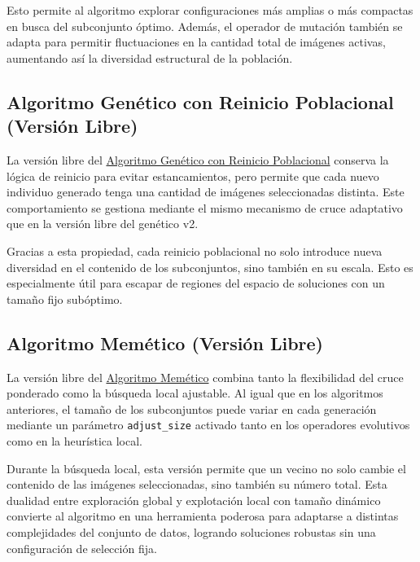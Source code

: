Esto permite al algoritmo explorar configuraciones más amplias o más compactas en busca del subconjunto óptimo.
Además, el operador de mutación también se adapta para permitir fluctuaciones en la cantidad total de imágenes activas,
aumentando así la diversidad estructural de la población.

\subsection{Algoritmo Genético con Reinicio Poblacional (Versión Libre)}\label{subsec:genetico-v3-libre}

La versión libre del \hyperref[sec:genetico-v3]{Algoritmo Genético con Reinicio Poblacional} conserva la lógica de reinicio para evitar estancamientos,
pero permite que cada nuevo individuo generado tenga una cantidad de imágenes seleccionadas distinta.
Este comportamiento se gestiona mediante el mismo mecanismo de cruce adaptativo que en la versión libre del genético v2.

Gracias a esta propiedad, cada reinicio poblacional no solo introduce nueva diversidad en el contenido de los subconjuntos, sino también en su escala.
Esto es especialmente útil para escapar de regiones del espacio de soluciones con un tamaño fijo subóptimo.

\subsection{Algoritmo Memético (Versión Libre)}\label{subsec:memetico-libre}

La versión libre del \hyperref[sec:algoritmo-memetico]{Algoritmo Memético} combina tanto la flexibilidad del cruce ponderado como la búsqueda local ajustable.
Al igual que en los algoritmos anteriores, el tamaño de los subconjuntos puede variar en cada generación mediante un parámetro \texttt{adjust\_size}
activado tanto en los operadores evolutivos como en la heurística local.

Durante la búsqueda local, esta versión permite que un vecino no solo cambie el contenido de las imágenes seleccionadas, sino también su número total.
Esta dualidad entre exploración global y explotación local con tamaño dinámico convierte al algoritmo en una herramienta poderosa para adaptarse a
distintas complejidades del conjunto de datos, logrando soluciones robustas sin una configuración de selección fija.
